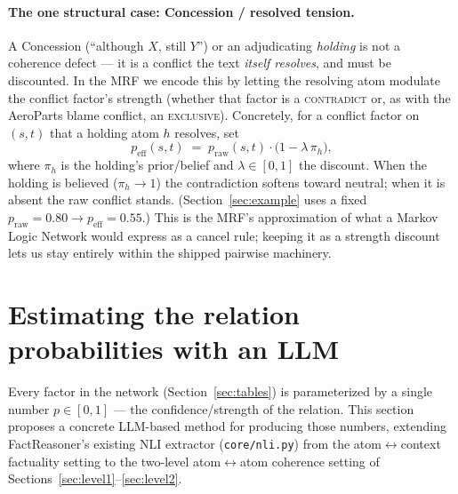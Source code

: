 \documentclass[11pt]{article}
\begin{document}
\paragraph{The one structural case: Concession / resolved tension.}
A Concession (``although $X$, still $Y$'') or an adjudicating \emph{holding} is not a
coherence defect --- it is a conflict the text \emph{itself resolves}, and must be
discounted. In the MRF we encode this by letting the resolving atom modulate the conflict
factor's strength (whether that factor is a \textsc{contradict} or, as with the AeroParts
blame conflict, an \textsc{exclusive}). Concretely, for a conflict factor on $(s,t)$ that a
holding atom $h$ resolves, set
\begin{equation}
  p_{\text{eff}}(s,t)\;=\;p_{\text{raw}}(s,t)\cdot\big(1-\lambda\,\pi_h\big),
  \label{eq:concession}
\end{equation}
where $\pi_h$ is the holding's prior/belief and $\lambda\in[0,1]$ the discount. When the
holding is believed ($\pi_h\!\to\!1$) the contradiction softens toward neutral; when it is
absent the raw conflict stands. (Section~\ref{sec:example} uses a fixed
$p_{\text{raw}}{=}0.80 \to p_{\text{eff}}{=}0.55$.) This is the MRF's approximation of what a
Markov Logic Network would express as a cancel rule; keeping it as a strength discount lets
us stay entirely within the shipped pairwise machinery.

\section{Estimating the relation probabilities with an LLM}
\label{sec:estimate}

Every factor in the network (Section~\ref{sec:tables}) is parameterized by a single number
$p\in[0,1]$ --- the confidence/strength of the relation. This section proposes a concrete
LLM-based method for producing those numbers, extending FactReasoner's existing NLI
extractor (\texttt{core/nli.py}) from the atom$\leftrightarrow$context factuality setting to
the two-level atom$\leftrightarrow$atom coherence setting of
Sections~\ref{sec:level1}--\ref{sec:level2}.
\end{document}
